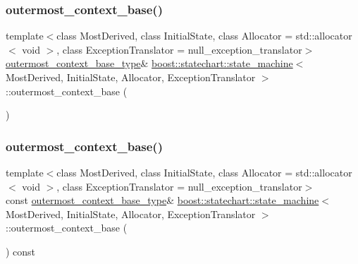 \mbox{\label{classboost_1_1statechart_1_1state__machine_a799d85b75a1d8f6eb4bc637427aab641}} 
\subsubsection{\texorpdfstring{outermost\+\_\+context\+\_\+base()}{outermost\_context\_base()}\hspace{0.1cm}{\footnotesize\ttfamily [1/2]}}
{\footnotesize\ttfamily template$<$class Most\+Derived, class Initial\+State, class Allocator = std\+::allocator$<$ void $>$, class Exception\+Translator = null\+\_\+exception\+\_\+translator$>$ \\
\mbox{\hyperlink{classboost_1_1statechart_1_1state__machine_a05b007af532fafe2f186a18351beaa5e}{outermost\+\_\+context\+\_\+base\+\_\+type}}\& \mbox{\hyperlink{classboost_1_1statechart_1_1state__machine}{boost\+::statechart\+::state\+\_\+machine}}$<$ Most\+Derived, Initial\+State, Allocator, Exception\+Translator $>$\+::outermost\+\_\+context\+\_\+base (\begin{DoxyParamCaption}{ }\end{DoxyParamCaption})\hspace{0.3cm}{\ttfamily [inline]}}

\mbox{\label{classboost_1_1statechart_1_1state__machine_a29f6efc956b6277593d2cd4dcd963e12}} 
\subsubsection{\texorpdfstring{outermost\+\_\+context\+\_\+base()}{outermost\_context\_base()}\hspace{0.1cm}{\footnotesize\ttfamily [2/2]}}
{\footnotesize\ttfamily template$<$class Most\+Derived, class Initial\+State, class Allocator = std\+::allocator$<$ void $>$, class Exception\+Translator = null\+\_\+exception\+\_\+translator$>$ \\
const \mbox{\hyperlink{classboost_1_1statechart_1_1state__machine_a05b007af532fafe2f186a18351beaa5e}{outermost\+\_\+context\+\_\+base\+\_\+type}}\& \mbox{\hyperlink{classboost_1_1statechart_1_1state__machine}{boost\+::statechart\+::state\+\_\+machine}}$<$ Most\+Derived, Initial\+State, Allocator, Exception\+Translator $>$\+::outermost\+\_\+context\+\_\+base (\begin{DoxyParamCaption}{ }\end{DoxyParamCaption}) const\hspace{0.3cm}{\ttfamily [inline]}}

